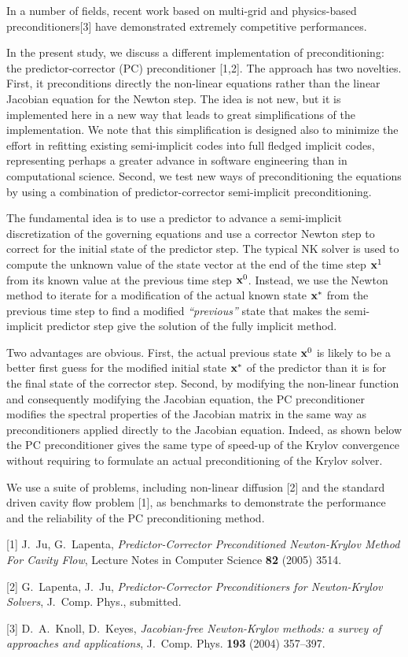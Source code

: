 \documentclass{report}
\begin{document}
In
a number of fields, recent work based on multi-grid and
physics-based preconditioners[3] have demonstrated extremely
competitive performances.

In the present study, we
discuss a different implementation of preconditioning: the
predictor-corrector (PC) preconditioner [1,2]. The approach
has two novelties. First, it preconditions directly the
non-linear equations rather than the linear Jacobian
equation for the Newton step. The idea is not
new, but it is implemented here in a new way
that leads to great simplifications of the implementation.
We note that this simplification is designed also to
minimize the effort in refitting existing semi-implicit
codes into full fledged implicit codes, representing perhaps
a greater advance in software engineering than in
computational science. Second, we test new ways of
preconditioning the equations by using a combination of
predictor-corrector semi-implicit preconditioning.

The
fundamental idea is to use a predictor to advance a
semi-implicit discretization of the governing equations and
use a corrector Newton step to correct for the initial state
of the predictor step. The typical NK solver is used to
compute the unknown value of the state vector at the end of
the time step ${\bf x}^{1}$ from its known value at the
previous time step ${\bf x}^0$. Instead, we use the Newton
method to iterate for a modification of the actual known
state $ {\bf x}^{*}$ from the previous time step to find a
modified {\it ``previous''} state that makes the semi-implicit
predictor step give the solution of the fully implicit
method.

Two advantages are obvious. First, the actual
previous state ${\bf x}^0$ is likely to be a better first
guess for the modified initial state $ {\bf x}^{*}$ of the
predictor than it is for the final state of the corrector
step. Second, by modifying the non-linear function and
consequently modifying the Jacobian equation, the PC
preconditioner modifies the spectral properties of the
Jacobian matrix in the same way as preconditioners applied
directly to the Jacobian equation. Indeed, as shown below
the PC preconditioner gives the same type of speed-up of the
Krylov convergence without requiring to formulate an actual
preconditioning of the Krylov solver.

We use a suite of
problems, including non-linear diffusion [2] and the standard
driven cavity flow problem [1], as benchmarks to demonstrate
the performance and the reliability of the PC
preconditioning method.

[1] J.~Ju, G.~Lapenta,
{\em Predictor-Corrector Preconditioned Newton-Krylov Method
For Cavity Flow}, Lecture Notes in Computer Science
{\bf 82} (2005) 3514.

[2] G.~Lapenta, J.~Ju, {\em Predictor-Corrector
Preconditioners for Newton-Krylov Solvers},
J.~Comp. Phys., submitted.

[3] D.~A.~Knoll, D.~Keyes,
{\em Jacobian-free Newton-Krylov methods: a survey of
approaches and applications}, J.~Comp. Phys. {\bf 193}
(2004) 357--397.



\end{document}
